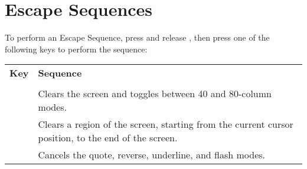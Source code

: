 \section{Escape Sequences}
\label{escape-sequences}
To perform an Escape Sequence, press and release , then press one of the following keys to perform
the sequence:

\begin{center}
\begin{longtable}{c|L{5.5cm}}
	\textbf{Key} & \textbf{Sequence}\\
  \hhline{==}
	\endhead

   \\
  \hhline{==}
  &
Clears the screen and toggles between 40 and 80-column modes.\\
\hline
{}  &
Clears a region of the screen, starting from the current cursor position, to the end of the screen.\\
\hline
{}  &
Cancels the quote, reverse, underline, and flash modes.\\


\end{longtable}
\end{center}
